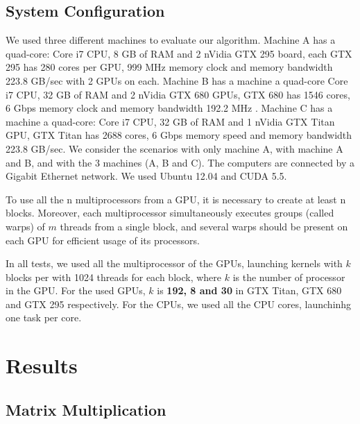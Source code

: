 \documentclass[journal]{IEEEtran}
\begin{document}
\subsection{System Configuration}

We used three different machines to evaluate our algorithm. Machine A has a quad-core: Core i7 CPU, 8 GB of RAM and 2 nVidia GTX 295 board, each GTX 295 has 280 cores per GPU, 999 MHz memory clock and memory bandwidth 223.8 GB/sec with 2
GPUs on each. Machine B has a machine a quad-core Core i7 CPU, 32 GB of RAM and
2 nVidia GTX 680 GPUs, GTX 680 has 1546 cores, 6 Gbps memory clock and memory bandwidth 192.2 MHz .  Machine C has a machine a quad-core: Core i7 CPU, 32 GB
of RAM and 1 nVidia GTX Titan GPU, GTX Titan has 2688 cores, 6 Gbps memory speed and  memory bandwidth 223.8 GB/sec. We consider the scenarios with only machine
A, with machine A and B, and with the 3 machines (A, B and C). The computers are
connected by a Gigabit Ethernet network. We used Ubuntu 12.04 and CUDA 5.5.

To use all the n multiprocessors from a GPU, it is necessary to create at least
n blocks. Moreover, each multiprocessor simultaneously executes groups (called
warps) of $m$ threads from a single block, and several warps should be present
on each GPU for efficient usage of its processors.

In all tests, we used all the multiprocessor of the GPUs, launching kernels with
$k$ blocks per with 1024 threads for each block, where $k$ is the number of
processor in the GPU. For the used GPUs, $k$ is \textbf{192, 8 and 30} in  GTX Titan, GTX 680 and GTX 295 respectively. For the CPUs, we used all the CPU cores, launchinhg one task per core.



\section{Results}


\subsection{Matrix Multiplication}
\end{document}
